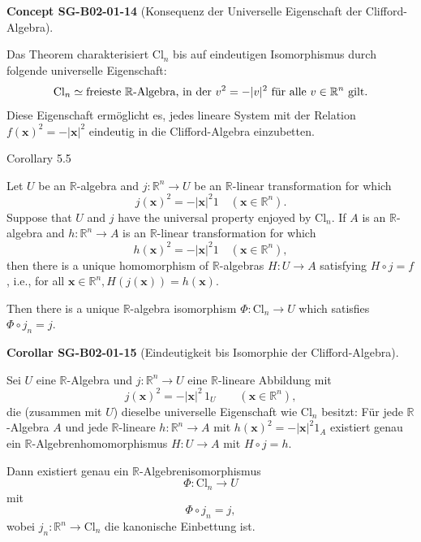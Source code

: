 \documentclass[10pt, letterpaper]{article}
\newcommand{\CustomHeading}[3]{%
  \par\medskip\noindent%
  \textbf{#1 #2} \textnormal{(#3)}.\enskip%
}
\newenvironment{KORO}[2]{\begin{unitbox}\CustomHeading{Corollar}{#1}{#2}}{\end{unitbox}}
\newenvironment{CONC}[2]{\begin{unitbox}\CustomHeading{Concept}{#1}{#2}}{\end{unitbox}}
\begin{document}
\begin{CONC}{SG-B02-01-14}{Konsequenz der Universelle Eigenschaft der Clifford-Algebra}
Das Theorem charakterisiert $\mathrm{Cl}_n$ bis auf eindeutigen Isomorphismus durch folgende universelle Eigenschaft:
\[
\mathrm{Cl}_n 
\simeq
\text{freieste $\mathbb{R}$\nobreakdash-Algebra, in der $v^2 = -|v|^2$ für alle $v \in \mathbb{R}^n$ gilt.}
\]
Diese Eigenschaft ermöglicht es, jedes lineare System mit der Relation $f(\mathbf{x})^2=-|\mathbf{x}|^2$ eindeutig in die Clifford-Algebra einzubetten.
\end{CONC}



Corollary 5.5

Let $U$ be an $\mathbb{R}$-algebra and $j: \mathbb{R}^{n} \longrightarrow U$ be an $\mathbb{R}$-linear transformation for which
$$
j(\mathbf{x})^{2}=-|\mathbf{x}|^{2} 1 \quad\left(\mathbf{x} \in \mathbb{R}^{n}\right) .
$$
Suppose that $U$ and $j$ have the universal property enjoyed by $\mathrm{Cl}_{n}$. If $A$ is an $\mathbb{R}$-algebra and $h: \mathbb{R}^{n} \longrightarrow A$ is an $\mathbb{R}$-linear transformation for which
$$
h(\mathbf{x})^{2}=-|\mathbf{x}|^{2} 1 \quad\left(\mathbf{x} \in \mathbb{R}^{n}\right),
$$
then there is a unique homomorphism of $\mathbb{R}$-algebras $H: U \longrightarrow A$ satisfying $H \circ j=f$, i.e., for all $\mathbf{x} \in \mathbb{R}^{n}, H(j(\mathbf{x}))=h(\mathbf{x})$.

Then there is a unique $\mathbb{R}$-algebra isomorphism $\Phi: \mathrm{Cl}_{n} \longrightarrow U$ which satisfies $\Phi \circ j_{n}=j$.



\begin{KORO}{SG-B02-01-15}{Eindeutigkeit bis Isomorphie der Clifford-Algebra}
Sei $U$ eine $\mathbb{R}$\nobreakdash-Algebra und $j:\mathbb{R}^n\to U$ eine
$\mathbb{R}$\nobreakdash-lineare Abbildung mit
\[
j(\mathbf{x})^2=-\lvert\mathbf{x}\rvert^2\,1_U \qquad (\mathbf{x}\in\mathbb{R}^n),
\]
die (zusammen mit $U$) dieselbe universelle Eigenschaft wie $\mathrm{Cl}_n$ besitzt: 
Für jede $\mathbb{R}$\nobreakdash-Algebra $A$ und jede $\mathbb{R}$\nobreakdash-lineare
$h:\mathbb{R}^n\to A$ mit $h(\mathbf{x})^2=-\lvert\mathbf{x}\rvert^2 1_A$ existiert genau ein
$\mathbb{R}$\nobreakdash-Algebrenhomomorphismus $H:U\to A$ mit $H\circ j=h$.

Dann existiert genau ein $\mathbb{R}$\nobreakdash-Algebrenisomorphismus
\[
\Phi:\mathrm{Cl}_n\longrightarrow U
\]
mit
\[
\Phi\circ j_n = j,
\]
wobei $j_n:\mathbb{R}^n\to \mathrm{Cl}_n$ die kanonische Einbettung ist.
\end{KORO}
\end{document}
